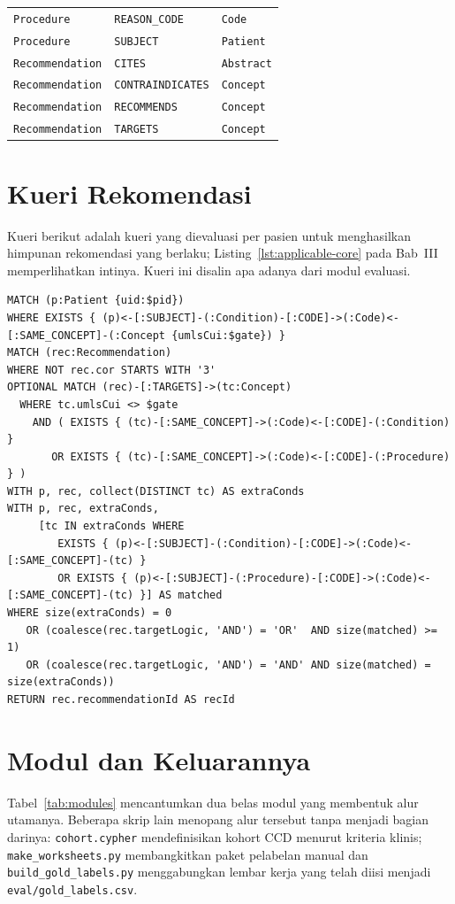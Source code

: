 \begin{longtable}{@{}p{46mm}p{52mm}p{40mm}@{}}
\texttt{Procedure} & \texttt{REASON\_CODE} & \texttt{Code} \\
\texttt{Procedure} & \texttt{SUBJECT} & \texttt{Patient} \\
\texttt{Recommendation} & \texttt{CITES} & \texttt{Abstract} \\
\texttt{Recommendation} & \texttt{CONTRAINDICATES} & \texttt{Concept} \\
\texttt{Recommendation} & \texttt{RECOMMENDS} & \texttt{Concept} \\
\texttt{Recommendation} & \texttt{TARGETS} & \texttt{Concept} \\
\end{longtable}

\section{Kueri Rekomendasi}
\label{app:queries}
Kueri berikut adalah kueri yang dievaluasi per pasien untuk menghasilkan himpunan
rekomendasi yang berlaku; Listing~\ref{lst:applicable-core} pada Bab~III
memperlihatkan intinya. Kueri ini disalin apa adanya dari modul evaluasi.

\begin{lstlisting}[caption={Rekomendasi yang berlaku bagi satu pasien.},label={lst:applicable-full}]
MATCH (p:Patient {uid:$pid})
WHERE EXISTS { (p)<-[:SUBJECT]-(:Condition)-[:CODE]->(:Code)<-[:SAME_CONCEPT]-(:Concept {umlsCui:$gate}) }
MATCH (rec:Recommendation)
WHERE NOT rec.cor STARTS WITH '3'
OPTIONAL MATCH (rec)-[:TARGETS]->(tc:Concept)
  WHERE tc.umlsCui <> $gate
    AND ( EXISTS { (tc)-[:SAME_CONCEPT]->(:Code)<-[:CODE]-(:Condition) }
       OR EXISTS { (tc)-[:SAME_CONCEPT]->(:Code)<-[:CODE]-(:Procedure) } )
WITH p, rec, collect(DISTINCT tc) AS extraConds
WITH p, rec, extraConds,
     [tc IN extraConds WHERE
        EXISTS { (p)<-[:SUBJECT]-(:Condition)-[:CODE]->(:Code)<-[:SAME_CONCEPT]-(tc) }
        OR EXISTS { (p)<-[:SUBJECT]-(:Procedure)-[:CODE]->(:Code)<-[:SAME_CONCEPT]-(tc) }] AS matched
WHERE size(extraConds) = 0
   OR (coalesce(rec.targetLogic, 'AND') = 'OR'  AND size(matched) >= 1)
   OR (coalesce(rec.targetLogic, 'AND') = 'AND' AND size(matched) = size(extraConds))
RETURN rec.recommendationId AS recId
\end{lstlisting}

\section{Modul dan Keluarannya}
\label{app:modules}
Tabel~\ref{tab:modules} mencantumkan dua belas modul yang membentuk alur utamanya. Beberapa
skrip lain menopang alur tersebut tanpa menjadi bagian darinya: \texttt{cohort.cypher}
mendefinisikan kohort CCD menurut kriteria klinis; \texttt{make\_worksheets.py}
membangkitkan paket pelabelan manual dan \texttt{build\_gold\_labels.py} menggabungkan
lembar kerja yang telah diisi menjadi \texttt{eval/gold\_labels.csv}.

